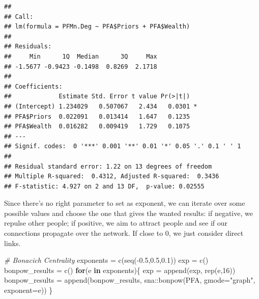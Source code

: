 \documentclass[
  notitlepage,
  onecolumn,
  openany]{book}
\newenvironment{Shaded}{\begin{snugshade}}{\end{snugshade}}
\newcommand{\AttributeTok}[1]{\textcolor[rgb]{0.77,0.63,0.00}{#1}}
\newcommand{\CommentTok}[1]{\textcolor[rgb]{0.56,0.35,0.01}{\textit{#1}}}
\newcommand{\ControlFlowTok}[1]{\textcolor[rgb]{0.13,0.29,0.53}{\textbf{#1}}}
\newcommand{\DecValTok}[1]{\textcolor[rgb]{0.00,0.00,0.81}{#1}}
\newcommand{\DocumentationTok}[1]{\textcolor[rgb]{0.56,0.35,0.01}{\textbf{\textit{#1}}}}
\newcommand{\FloatTok}[1]{\textcolor[rgb]{0.00,0.00,0.81}{#1}}
\newcommand{\FunctionTok}[1]{\textcolor[rgb]{0.00,0.00,0.00}{#1}}
\newcommand{\NormalTok}[1]{#1}
\newcommand{\OtherTok}[1]{\textcolor[rgb]{0.56,0.35,0.01}{#1}}
\newcommand{\SpecialCharTok}[1]{\textcolor[rgb]{0.00,0.00,0.00}{#1}}
\newcommand{\StringTok}[1]{\textcolor[rgb]{0.31,0.60,0.02}{#1}}
\begin{document}
\begin{Shaded}
\end{Shaded}

\begin{verbatim}
## 
## Call:
## lm(formula = PFMn.Deg ~ PFA$Priors + PFA$Wealth)
## 
## Residuals:
##     Min      1Q  Median      3Q     Max 
## -1.5677 -0.9423 -0.1498  0.8269  2.1718 
## 
## Coefficients:
##             Estimate Std. Error t value Pr(>|t|)  
## (Intercept) 1.234029   0.507067   2.434   0.0301 *
## PFA$Priors  0.022091   0.013414   1.647   0.1235  
## PFA$Wealth  0.016282   0.009419   1.729   0.1075  
## ---
## Signif. codes:  0 '***' 0.001 '**' 0.01 '*' 0.05 '.' 0.1 ' ' 1
## 
## Residual standard error: 1.22 on 13 degrees of freedom
## Multiple R-squared:  0.4312, Adjusted R-squared:  0.3436 
## F-statistic: 4.927 on 2 and 13 DF,  p-value: 0.02555
\end{verbatim}

Since there's no right parameter to set as exponent, we can iterate over some possible values and choose the one that gives the wanted results: if negative, we repulse other people; if positive, we aim to attract people and see if our connections propagate over the network. If close to 0, we just consider direct links.

\begin{Shaded}
\begin{Highlighting}[]
\CommentTok{\# Bonacich Centrality}
\NormalTok{exponents }\OtherTok{=} \FunctionTok{c}\NormalTok{(}\FunctionTok{seq}\NormalTok{(}\SpecialCharTok{{-}}\FloatTok{0.5}\NormalTok{,}\FloatTok{0.5}\NormalTok{,}\FloatTok{0.1}\NormalTok{))}
\NormalTok{exp }\OtherTok{=} \FunctionTok{c}\NormalTok{()}
\NormalTok{bonpow\_results }\OtherTok{=} \FunctionTok{c}\NormalTok{()}
\ControlFlowTok{for}\NormalTok{(e }\ControlFlowTok{in}\NormalTok{ exponents)\{}
\NormalTok{   exp }\OtherTok{=} \FunctionTok{append}\NormalTok{(exp, }\FunctionTok{rep}\NormalTok{(e,}\DecValTok{16}\NormalTok{))}
\NormalTok{   bonpow\_results }\OtherTok{=} \FunctionTok{append}\NormalTok{(bonpow\_results,}
\NormalTok{                           sna}\SpecialCharTok{::}\FunctionTok{bonpow}\NormalTok{(PFA, }\AttributeTok{gmode=}\StringTok{"graph"}\NormalTok{, }\AttributeTok{exponent=}\NormalTok{e))}
\NormalTok{\}}
\end{Highlighting}
\end{Shaded}
\end{document}

